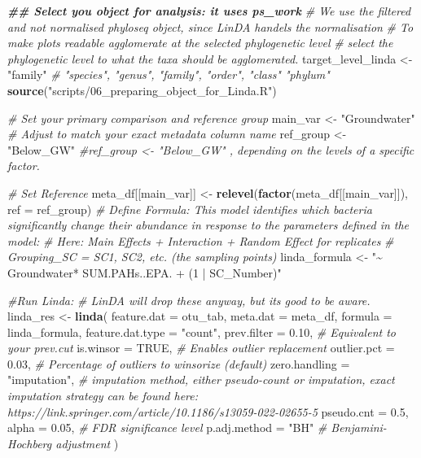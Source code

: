 \documentclass[
]{article}
\newenvironment{Shaded}{\begin{snugshade}}{\end{snugshade}}
\newcommand{\AttributeTok}[1]{\textcolor[rgb]{0.13,0.29,0.53}{#1}}
\newcommand{\CommentTok}[1]{\textcolor[rgb]{0.56,0.35,0.01}{\textit{#1}}}
\newcommand{\ConstantTok}[1]{\textcolor[rgb]{0.56,0.35,0.01}{#1}}
\newcommand{\DocumentationTok}[1]{\textcolor[rgb]{0.56,0.35,0.01}{\textbf{\textit{#1}}}}
\newcommand{\FloatTok}[1]{\textcolor[rgb]{0.00,0.00,0.81}{#1}}
\newcommand{\FunctionTok}[1]{\textcolor[rgb]{0.13,0.29,0.53}{\textbf{#1}}}
\newcommand{\NormalTok}[1]{#1}
\newcommand{\OtherTok}[1]{\textcolor[rgb]{0.56,0.35,0.01}{#1}}
\newcommand{\StringTok}[1]{\textcolor[rgb]{0.31,0.60,0.02}{#1}}
\begin{document}
\begin{Shaded}
\begin{Highlighting}[]
\DocumentationTok{\#\# Select you object for analysis: it uses ps\_work}
\CommentTok{\# We use the filtered and not normalised phyloseq object, since LinDA handels the normalisation}
\CommentTok{\# To make plots readable agglomerate at the selected phylogenetic level}
\CommentTok{\# select the phylogenetic level to what the taxa should be agglomerated.}
\NormalTok{target\_level\_linda }\OtherTok{\textless{}{-}} \StringTok{"family"} \CommentTok{\# "species", "genus", "family", "order", "class" "phylum"}
\FunctionTok{source}\NormalTok{(}\StringTok{"scripts/06\_preparing\_object\_for\_Linda.R"}\NormalTok{)}

\CommentTok{\# Set your primary comparison and reference group}
\NormalTok{main\_var }\OtherTok{\textless{}{-}} \StringTok{"Groundwater"} \CommentTok{\# Adjust to match your exact metadata column name}
\NormalTok{ref\_group }\OtherTok{\textless{}{-}} \StringTok{"Below\_GW"} \CommentTok{\#ref\_group \textless{}{-} "Below\_GW" , depending on the levels of a specific factor.}

\CommentTok{\# Set Reference}
\NormalTok{meta\_df[[main\_var]] }\OtherTok{\textless{}{-}} \FunctionTok{relevel}\NormalTok{(}\FunctionTok{factor}\NormalTok{(meta\_df[[main\_var]]), }\AttributeTok{ref =}\NormalTok{ ref\_group)}
\CommentTok{\# Define Formula: This model identifies which bacteria significantly change their abundance in response to the parameters defined in the model:}
\CommentTok{\# Here: Main Effects + Interaction + Random Effect for replicates}
\CommentTok{\# Grouping\_SC = SC1, SC2, etc. (the sampling points)}
\NormalTok{linda\_formula }\OtherTok{\textless{}{-}} \StringTok{"\textasciitilde{} Groundwater* SUM.PAHs..EPA. + (1 | SC\_Number)"}

\CommentTok{\#Run Linda:}
\CommentTok{\# LinDA will drop these anyway, but it\textquotesingle{}s good to be aware.}
\NormalTok{linda\_res }\OtherTok{\textless{}{-}} \FunctionTok{linda}\NormalTok{(}
  \AttributeTok{feature.dat =}\NormalTok{ otu\_tab, }
  \AttributeTok{meta.dat =}\NormalTok{ meta\_df, }
  \AttributeTok{formula =}\NormalTok{ linda\_formula,}
  \AttributeTok{feature.dat.type =} \StringTok{"count"}\NormalTok{,}
  \AttributeTok{prev.filter =} \FloatTok{0.10}\NormalTok{,        }\CommentTok{\# Equivalent to your prev.cut}
  \AttributeTok{is.winsor =} \ConstantTok{TRUE}\NormalTok{,          }\CommentTok{\# Enables outlier replacement}
  \AttributeTok{outlier.pct =} \FloatTok{0.03}\NormalTok{,        }\CommentTok{\# Percentage of outliers to winsorize (default)}
  \AttributeTok{zero.handling =} \StringTok{"imputation"}\NormalTok{, }\CommentTok{\# imputation method, either \textquotesingle{}pseudo{-}count\textquotesingle{} or imputation, exact imputation strategy can be found here: https://link.springer.com/article/10.1186/s13059{-}022{-}02655{-}5 }
  \AttributeTok{pseudo.cnt =} \FloatTok{0.5}\NormalTok{,}
  \AttributeTok{alpha =} \FloatTok{0.05}\NormalTok{,              }\CommentTok{\# FDR significance level}
  \AttributeTok{p.adj.method =} \StringTok{"BH"}        \CommentTok{\# Benjamini{-}Hochberg adjustment}
\NormalTok{)}
\end{Highlighting}
\end{Shaded}
\end{document}
